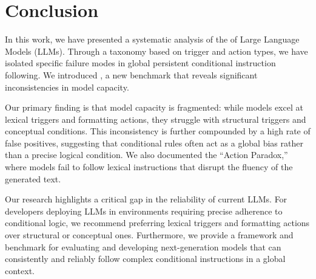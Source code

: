 \section{Conclusion}
\label{sec:conclusion}

In this work, we have presented a systematic analysis of the \ifcapacity of Large Language Models (LLMs). Through a taxonomy based on trigger and action types, we have isolated specific failure modes in global persistent conditional instruction following. We introduced \benchmark, a new benchmark that reveals significant inconsistencies in model capacity.

Our primary finding is that model capacity is fragmented: while models excel at lexical triggers and formatting actions, they struggle with structural triggers and conceptual conditions. This inconsistency is further compounded by a high rate of false positives, suggesting that conditional rules often act as a global bias rather than a precise logical condition. We also documented the ``Action Paradox,'' where models fail to follow lexical instructions that disrupt the fluency of the generated text.

Our research highlights a critical gap in the reliability of current LLMs. For developers deploying LLMs in environments requiring precise adherence to conditional logic, we recommend preferring lexical triggers and formatting actions over structural or conceptual ones. Furthermore, we provide a framework and benchmark for evaluating and developing next-generation models that can consistently and reliably follow complex conditional instructions in a global context.
